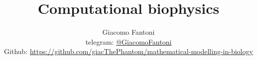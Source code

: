 

\title{\Huge\textbf{{Computational biophysics}}}

\author{
  Giacomo Fantoni \\
  \small telegram: \href{https://t.me/GiacomoFantoni}{@GiacomoFantoni} \\[3pt]
  \small Github: \href{https://github.com/giacThePhantom/mathematical-modelling-in-biology}{https://github.com/giacThePhantom/mathematical-modelling-in-biology}\\
}




  \maketitle
  \tableofcontents
  
  
  
  
  
  
  
  
  
  
  
  
  
  
  
  
  
  
  
  


